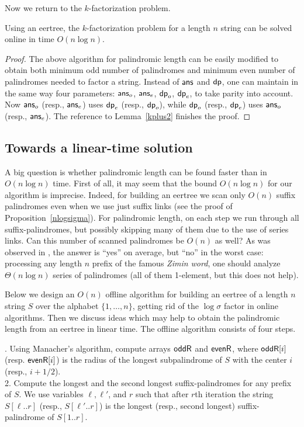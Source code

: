 \documentclass{llncs}
\def\ans{{\sf ans}}
\def\ddp{{\sf dp}}
\begin{document}
Now we return to the $k$-factorization problem.

\begin{proposition}
Using an eertree, the $k$-factorization problem for a length $n$ string can be solved online in time $O(n\log n)$. 
\end{proposition}

\begin{proof}
The above algorithm for palindromic length can be easily modified to obtain both minimum odd number of palindromes and minimum even number of palindromes needed to factor a string. Instead of $\ans$ and $\ddp$, one can maintain in the same way four parameters: $\ans_o$, $\ans_e$, $\ddp_o$, $\ddp_e$, to take parity into account. Now $\ans_o$ (resp., $\ans_e$) uses $\ddp_e$ (resp., $\ddp_o$), while $\ddp_o$ (resp., $\ddp_e$) uses $\ans_o$ (resp., $\ans_e$). The reference to Lemma~\ref{kplus2} finishes the proof.
\end{proof}


\subsection{Towards a linear-time solution}

A big question is whether palindromic length can be found faster than in $O(n\log n)$ time. First of all, it may seem that the bound $O(n\log n)$ for our algorithm is imprecise. Indeed, for building an eertree we scan only $O(n)$ suffix palindromes even when we use just suffix links (see the proof of Proposition~\ref{nlogsigma}). For palindromic length, on each step we run through all suffix-palindromes, but possibly skipping many of them due to the use of series links. Can this number of scanned palindromes be $O(n)$ as well? As was observed in \cite{FGKK14}, the answer is ``yes'' on average, but ``no'' in the worst case: processing any length $n$ prefix of the famous \emph{Zimin word}, one should analyze  $\Theta(n\log n)$ series of palindromes (all of them 1-element, but this does not help).

Below we design an $O(n)$ offline algorithm for building an eertree of a length $n$ string $S$ over the alphabet $\{1,\ldots,n\}$, getting rid of the $\log\sigma$ factor in online algorithms. Then we discuss ideas which may help to obtain the palindromic length from an eertree in linear time. The offline algorithm consists of four steps.



. Using Manacher's algorithm, compute arrays $\sf oddR$ and $\sf evenR$, where  ${\sf oddR}[i]$ (resp. ${\sf evenR}[i]$) is the radius of the longest subpalindrome of $S$ with the center $i$ (resp., $i{+}1/2$).\\[2pt]
2. Compute the longest and the second longest suffix-palindromes for any prefix of $S$. We use variables $\ell,\ell'$, and $r$ such that after $r$th iteration the string $S[\ell..r]$ (resp., $S[\ell'..r]$) is the longest (resp., second longest) suffix-palindrome of $S[1..r]$.  
\end{document}
